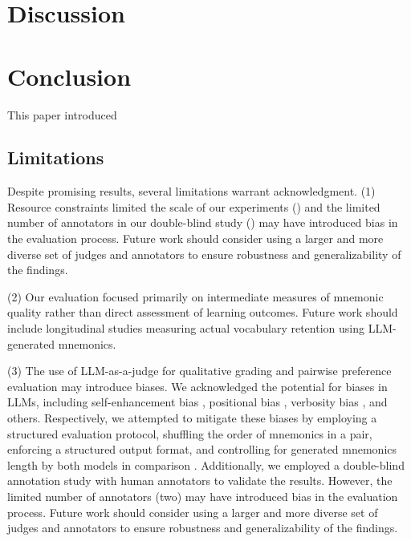 \section{Discussion} \label{sec:discussion}


\section{Conclusion} \label{sec:conclusion}
This paper introduced

\subsection{Limitations} \label{sec:limitations}
Despite promising results, several limitations warrant acknowledgment. (1) Resource constraints limited the scale of our experiments () and the limited number of annotators in our double-blind study () may have introduced bias in the evaluation process. Future work should consider using a larger and more diverse set of judges and annotators to ensure robustness and generalizability of the findings.

(2) Our evaluation focused primarily on intermediate measures of mnemonic quality rather than direct assessment of learning outcomes. Future work should include longitudinal studies measuring actual vocabulary retention using LLM-generated mnemonics.

(3) The use of LLM-as-a-judge for qualitative grading and pairwise preference evaluation may introduce biases. We acknowledged the potential for biases in LLMs, including self-enhancement bias \citep{panicksseryLLMEvaluatorsRecognize2024}, positional bias \citep{wangNotFairEvaluators2024,zhengJudgingLLMasajudgeMTbench2023}, verbosity bias \citep{zhengJudgingLLMasajudgeMTbench2023}, and others. Respectively, we attempted to mitigate these biases by employing a structured evaluation protocol, shuffling the order of mnemonics in a pair, enforcing a structured output format, and controlling for generated mnemonics length by both models in comparison \citep{guSurveyLLMasaJudge2025}. Additionally, we employed a double-blind annotation study with human annotators to validate the results. However, the limited number of annotators (two) may have introduced bias in the evaluation process. Future work should consider using a larger and more diverse set of judges and annotators to ensure robustness and generalizability of the findings.

